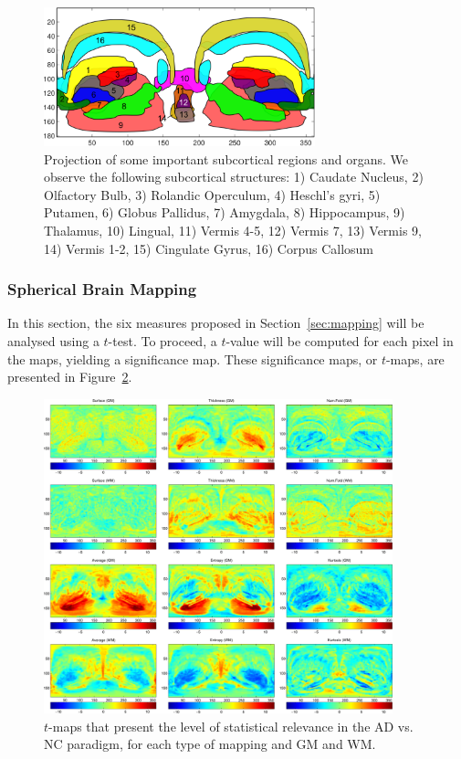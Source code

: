 \begin{figure}[htp]
	\centering
	\includegraphics[width=0.7\textwidth]{Graphics/ch6/06-regions_subcortical}
	
	\caption{Projection of some important subcortical regions and organs. We observe the following subcortical structures: 1) Caudate Nucleus, 2) Olfactory Bulb, 3) Rolandic Operculum, 4) Heschl's gyri, 5) Putamen, 6) Globus Pallidus, 7) Amygdala, 8) Hippocampus, 9) Thalamus, 10) Lingual, 11) Vermis 4-5, 12) Vermis 7, 13) Vermis 9, 14) Vermis 1-2, 15) Cingulate Gyrus, 16) Corpus Callosum}
	\label{fig:regionsSub}
\end{figure}

\subsubsection{Spherical Brain Mapping}\label{sec:sbmttest}
In this section, the six measures proposed in Section~\ref{sec:mapping} will be analysed using a $t$-test. To proceed, a $t$-value will be computed for each pixel in the maps, yielding a significance map. These significance maps, or $t$-maps, are presented in Figure~\ref{fig:tmaps}. 

\begin{figure}[htp]
	\centering
	\includegraphics[width=0.9\textwidth]{Graphics/ch6/07-tmaps}
	\caption{$t$-maps that present the level of statistical relevance in the AD vs. NC paradigm, for each type of mapping and \ac{GM} and \ac{WM}. }
	\label{fig:tmaps}
\end{figure}

